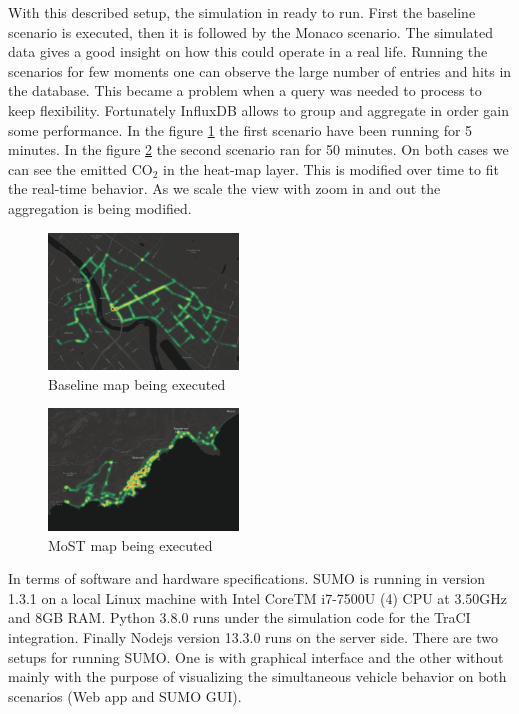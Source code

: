 \documentclass[letter, 10pt, conference]{ieeeconf}
\begin{document}
With this described setup, the simulation in ready to run.
First the baseline scenario is executed, then it is followed by the Monaco scenario.
The simulated data gives a good insight on how this could operate in a real life.
Running the scenarios for few moments one can observe the large number of entries and hits in the database.
This became a problem when a query was needed to process to keep flexibility.
Fortunately InfluxDB allows to group and aggregate in order gain some performance.
In the figure \ref{fig:running_tartu_1} the first scenario have been running for 5 minutes.
In the figure \ref{fig:running_monaco_2} the second scenario ran for 50 minutes.
On both cases we can see the emitted CO$_2$ in the heat-map layer.
This is modified over time to fit the real-time behavior.
As we scale the view with zoom in and out the aggregation is being modified.

\begin{figure}[h]
  \centering
  \includegraphics[width=0.45\textwidth]{running_tartu_1}
  \caption{Baseline map being executed}
  \label{fig:running_tartu_1}
\end{figure}

\begin{figure}[h]
  \centering
  \includegraphics[width=0.45\textwidth]{running_monaco_2}
  \caption{MoST map being executed}
  \label{fig:running_monaco_2}
\end{figure}

In terms of software and hardware specifications. SUMO is running in version 1.3.1 on a local Linux machine with Intel CoreTM i7-7500U (4) CPU at 3.50GHz and 8GB RAM.
Python 3.8.0 runs under the simulation code for the TraCI integration.
Finally Nodejs version 13.3.0 runs on the server side.
There are two setups for running SUMO.
One is with graphical interface and the other without mainly with the purpose of visualizing the simultaneous vehicle behavior on both scenarios (Web app and SUMO GUI).
\end{document}
